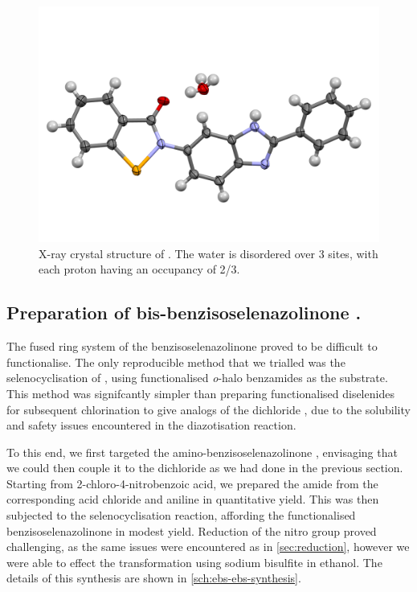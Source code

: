 \begin{refsection}
\begin{figure}[ht]
    \centering
    \includegraphics[width=0.8\linewidth]{Figures/ebs-rhs-xray.pdf}
    \caption{X-ray crystal structure of . The water is disordered over 3 sites, with each proton having an occupancy of 2/3.}
    \label{fig:ebs-rhs-xray}
\end{figure}

\subsection{Preparation of bis-benzisoselenazolinone .}

The fused ring system of the benzisoselenazolinone proved to be difficult to functionalise.
The only reproducible method that we trialled was the selenocyclisation of \citeauthor{Bhabak2010}, using functionalised \emph{o}-halo benzamides as the substrate.\autocite{Bhabak2010}
This method was signifcantly simpler than preparing functionalised diselenides for subsequent chlorination to give analogs of the dichloride , due to the solubility and safety issues encountered in the diazotisation reaction.

To this end, we first targeted the amino-benzisoselenazolinone , envisaging that we could then couple it to the dichloride  as we had done in the previous section.
Starting from 2-chloro-4-nitrobenzoic acid, we prepared the amide  from the corresponding acid chloride and aniline in quantitative yield.
This was then subjected to the selenocyclisation reaction, affording the functionalised benzisoselenazolinone  in modest yield.
Reduction of the nitro group proved challenging, as the same issues were encountered as in \cref{sec:reduction}, however we were able to effect the transformation using sodium bisulfite in ethanol.
The details of this synthesis are shown in \cref{sch:ebs-ebs-synthesis}.


\end{refsection}
